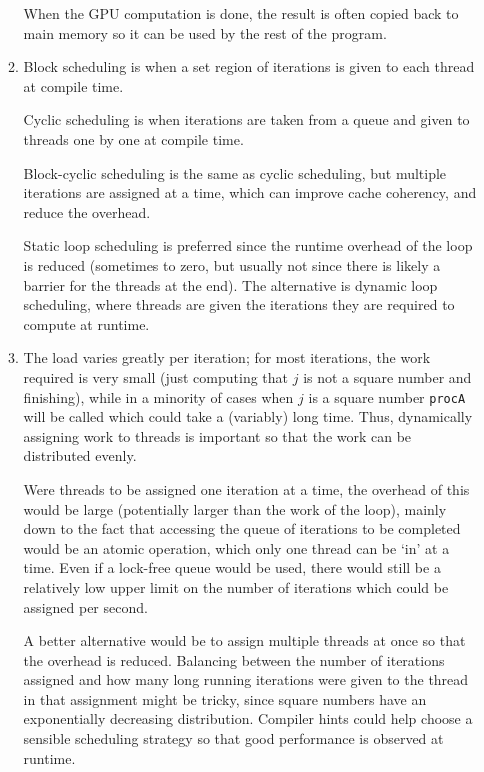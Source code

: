 \documentclass{report}
\begin{document}
\begin{enumerate}
\begin{enumerate}
    When the GPU computation is done, the result is often copied back
    to main memory so it can be used by the rest of the program.
  \item Block scheduling is when a set region of iterations is given
    to each thread at compile time.

    Cyclic scheduling is when iterations are taken from a queue and
    given to threads one by one at compile time.

    Block-cyclic scheduling is the same as cyclic scheduling, but
    multiple iterations are assigned at a time, which can improve
    cache coherency, and reduce the overhead.

    Static loop scheduling is preferred since the runtime overhead of
    the loop is reduced (sometimes to zero, but usually not since
    there is likely a barrier for the threads at the end). The
    alternative is dynamic loop scheduling, where threads are given
    the iterations they are required to compute at runtime.
  \item The load varies greatly per iteration; for most iterations,
    the work required is very small (just computing that $j$ is not a
    square number and finishing), while in a minority of cases when
    $j$ is a square number \texttt{procA} will be called which could
    take a (variably) long time. Thus, dynamically assigning work to
    threads is important so that the work can be distributed evenly.

    Were threads to be assigned one iteration at a time, the overhead
    of this would be large (potentially larger than the work of the
    loop), mainly down to the fact that accessing the queue of
    iterations to be completed would be an atomic operation, which
    only one thread can be `in' at a time. Even if a lock-free queue
    would be used, there would still be a relatively low upper limit
    on the number of iterations which could be assigned per second.

    A better alternative would be to assign multiple threads at once
    so that the overhead is reduced. Balancing between the number of
    iterations assigned and how many long running iterations were
    given to the thread in that assignment might be tricky, since
    square numbers have an exponentially decreasing
    distribution. Compiler hints could help choose a sensible
    scheduling strategy so that good performance is observed at
    runtime.


\end{enumerate}
\end{enumerate}
\end{document}
